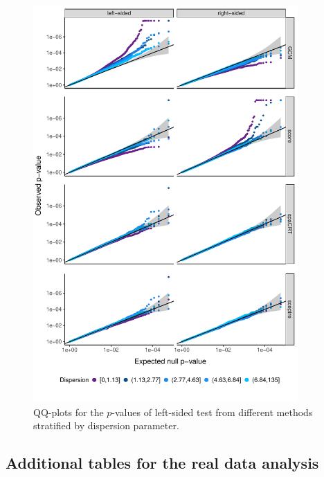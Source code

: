 \documentclass[12pt]{article}
\theoremstyle{definition}
\begin{document}
\begin{figure}[!ht]
	\centering
	\includegraphics[width=0.9\textwidth]{figures-and-tables/facet_plot_different_withglmnb_dispersion.pdf}
	\caption{QQ-plots for the $p$-values of left-sided test from different methods stratified by dispersion parameter.}
	\label{fig:qqplot_dispersion}
\end{figure}

\clearpage

\subsection{Additional tables for the real data analysis}\label{sec:additional_table_realdata}


\end{document}
